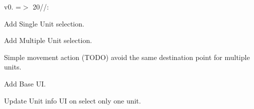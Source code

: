 v0. =\texorpdfstring{$>$}{>} 20//:\+
\begin{DoxyItemize}
\item Add Single Unit selection.
\item Add Multiple Unit selection.
\item Simple movement action (TODO) avoid the same destination point for multiple units.
\item Add Base UI.
\item Update Unit info UI on select only one unit. 
\end{DoxyItemize}